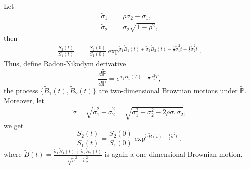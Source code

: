 \documentclass[paper=a4, fontsize=10pt,]{scrartcl} %
\theoremstyle{theorem}
\theoremstyle{remark}
\theoremstyle{example}
\numberwithin{equation}{section} %
\numberwithin{figure}{section} %
\numberwithin{table}{section} %
\begin{document}
Let 
\begin{align*}
\tilde{\sigma}_1 &= \rho \sigma_2 - \sigma_1, \\
\tilde{\sigma}_2 &= \sigma_2 \sqrt{1-\rho^2},
\end{align*}
then
\begin{align*}
\frac{S_2(t)}{S_1(t)} &= \frac{S_2(0)}{S_1(0)}\exp^{ \tilde{\sigma}_1\tilde{B}_1(t) + \tilde{\sigma}_2 \tilde{B}_2(t) -\frac{1}{2}\tilde{\sigma}_1^2 t -\frac{1}{2}\tilde{\sigma}_2^2 t}.
\end{align*}
Thus, define Radon-Nikodym derivative
$$
\frac{d\tilde{\mathbb{P}}}{d \mathbb{P}} = e^{\sigma_1 B_1(T) -\frac{1}{2}\sigma_1^2 T},
$$
the process $\{\tilde{B}_1(t),\tilde{B}_2(t)\}$ are two-dimensional Brownian motions under $\tilde{\mathbb{P}}$. Moreover, let 
$$\tilde{\sigma} = \sqrt{\tilde{\sigma}_1^2 + \tilde{\sigma}_2^2} = \sqrt{\sigma_1^2 + \sigma_2^2 -2\rho \sigma_1\sigma_2},$$
we get
$$
\frac{S_2(t)}{S_1(t)} = \frac{S_2(0)}{S_1(0)}\exp^{ \tilde{\sigma}\tilde{B}(t)  -\frac{1}{2}\tilde{\sigma}^2 t},
$$
where $\tilde{B}(t) =\frac{\tilde{\sigma}_1\tilde{B}_1(t) + \tilde{\sigma}_2\tilde{B}_2(t)}{\sqrt{\tilde{\sigma}_1^2 + \tilde{\sigma}_2^2}}$ is again a one-dimensional Brownian motion. 

\newpage
\end{document}

